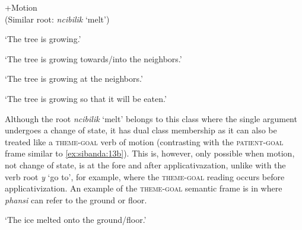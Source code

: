 \documentclass[output=paper]{langsci/langscibook}
\begin{document}
\ea\label{ex:sibanda:13}
\settowidth{}
 {+Motion}\\
 (Similar root: \textit{ncibilik} ‘melt’)\\

\glt ‘The tree is growing.’


\glt ‘The tree is growing towards/into the neighbors.’


\glt ‘The tree is growing at the neighbors.’ 


\glt ‘The tree is growing so that it will be eaten.’ 
\z
\z

Although the root \textit{ncibilik} ‘melt’ belongs to this class where the single argument undergoes a change of state, it has dual class membership as it can also be treated like a \textsc{theme-goal} verb of motion (contrasting with the \textsc{patient-goal} frame similar to \ref{ex:sibanda:13b}). This is, however, only possible when motion, not change of state, is at the fore and after applicativazation, unlike with the verb root \textit{y} ‘go to’, for example, where the \textsc{theme-goal} reading occurs before applicativization. An example of the \textsc{theme-goal} semantic frame is in  where \textit{phansi} can refer to the ground or floor. 

\glt ‘The ice melted onto the ground/floor.’
\z
\end{document}
